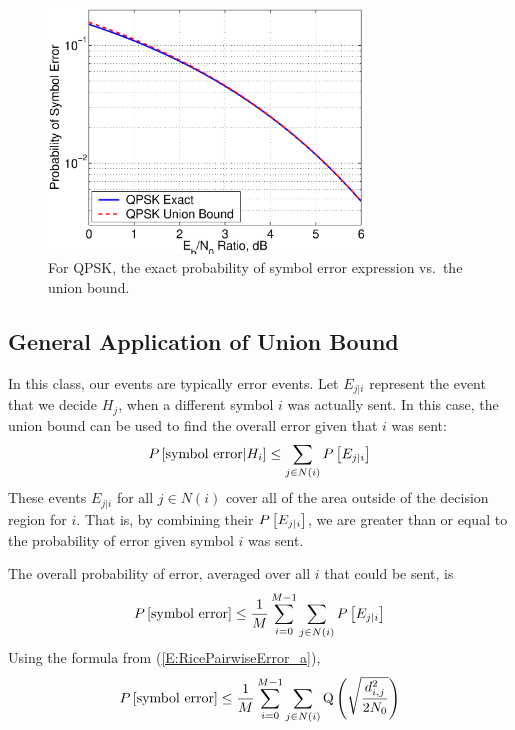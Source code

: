 \begin{figure}[htbp]
  \centerline{\includegraphics[width=0.75\textwidth]{../images/plotProbBitErrPSK_UnionBound.eps} }
  \caption{For QPSK, the exact probability of symbol error expression vs.\ the union bound.  }
  \label{F:PERPlotUnionBound}
\end{figure}


\subsection{General Application of Union Bound}

In this class, our events are typically error events.  Let $E_{j|i}$  represent the event that we decide $H_j$, when a different
symbol $i$ was actually sent.  In this case,  the union bound can be used to find the overall error given that $i$ was sent:
\begin{equation} \label{E:UnionBound_5}
  P\left[{ \mbox{symbol error} | H_i }\right] \le \sum_{j\in N(i)} P\left[{E_{j|i}}\right]
\end{equation}
These events $E_{j|i}$ for all $j\in N(i)$ cover all of the area outside of the decision region for $i$.  That is, by combining their $P\left[{E_{j|i}}\right]$, we are greater than or equal to the probability of error given symbol $i$ was sent.  

The overall probability of error, averaged over all $i$ that could be sent, is 
\begin{equation} \label{E:UnionBoundMid}
  P\left[{ \mbox{symbol error} }\right] \le \frac{1}{M} \sum_{i=0}^{M-1} \sum_{j\in N(i)} P\left[{E_{j|i}}\right] 
\end{equation}
Using the formula from (\ref{E:RicePairwiseError_a}),
\begin{equation} \label{E:UnionBound_applied}
  P\left[{ \mbox{symbol error} }\right] \le \frac{1}{M} \sum_{i=0}^{M-1} \sum_{j\in N(i)}  {\mbox{Q}\left( {\sqrt{\frac{d^2_{i,j}}{2N_0}}} \right)}
\end{equation}

